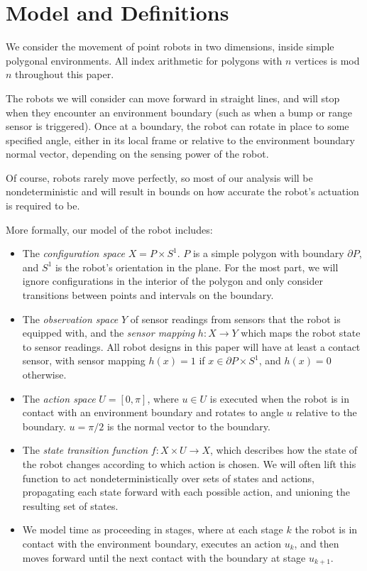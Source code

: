 \documentclass[]{styles/svproc}  %
\begin{document}
\section{Model and Definitions}

We consider the movement of point robots in two dimensions, inside simple polygonal
environments. All index arithmetic for polygons with $n$ vertices is mod $n$ 
throughout this paper.

The robots we will consider can move forward in straight lines, and will stop
when they encounter an environment boundary (such as when a bump or range
sensor is triggered). Once at a boundary, the robot can rotate in place to some
specified angle, either in its local frame or relative to the environment
boundary normal vector, depending on the sensing power of the robot.

Of course, robots rarely move perfectly, so most of our analysis will be
nondeterministic and will result in bounds on how accurate the robot's actuation
is required to be.

More formally, our model of the robot includes:

\begin{itemize}
\item The \emph{configuration space} $X = P \times S^1$. $P$ is a simple polygon with 
boundary $\partial P$, and $S^1$ is the robot's orientation in the plane. For the most part, we will ignore configurations in the interior
of the polygon and only consider transitions between points and intervals on the
boundary.
\item The \emph{observation space} $Y$ of sensor readings from sensors that the
robot is equipped with, and the \emph{sensor mapping} $h: X \to Y$ which maps
the robot state to sensor readings. All robot designs in this paper will have at
least a contact sensor, with sensor mapping $h(x) = 1$ if $x \in \partial
P \times S^1$, and $h(x) = 0$ otherwise.
\item The \emph{action space} $U = [0,\pi]$, where $u \in U$ is executed when
the robot is in contact with an environment boundary and rotates to angle $u$
relative to the boundary. $u = \pi/2$ is the normal vector to the boundary.
\item The \emph{state transition function} $f: X \times U \to X$, which
describes how the state of the robot changes according to which action is
chosen. We will often lift this function to act nondeterministically over sets
of states and actions, propagating each state forward with each possible action,
and unioning the resulting set of states.
\item We model time as proceeding in stages, where at each stage $k$ the robot
is in contact with the environment boundary, executes an action $u_k$, and then
moves forward until the next contact with the boundary at stage $u_{k+1}$.
\end{itemize}
\end{document}
